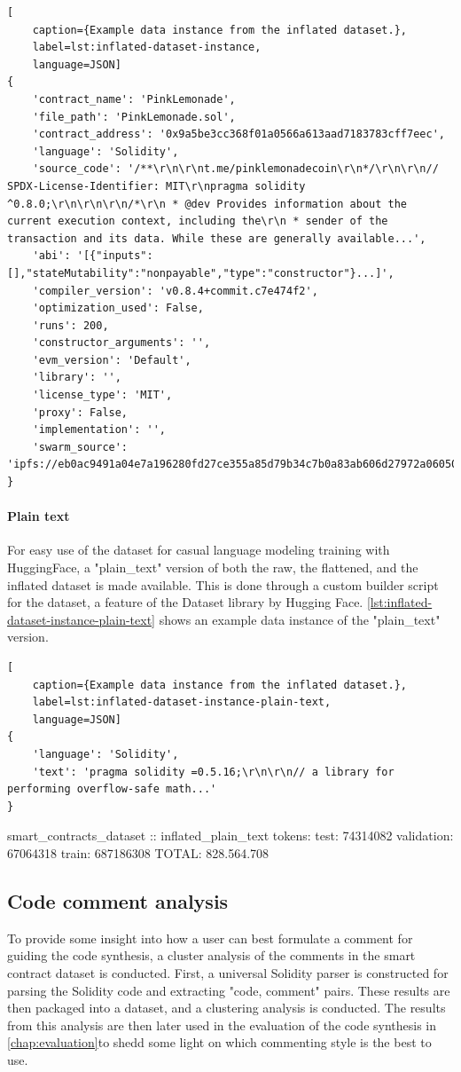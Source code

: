 \begin{lstlisting}[
    caption={Example data instance from the inflated dataset.},
    label=lst:inflated-dataset-instance,
    language=JSON]
{
    'contract_name': 'PinkLemonade',
    'file_path': 'PinkLemonade.sol',
    'contract_address': '0x9a5be3cc368f01a0566a613aad7183783cff7eec',
    'language': 'Solidity',
    'source_code': '/**\r\n\r\nt.me/pinklemonadecoin\r\n*/\r\n\r\n// SPDX-License-Identifier: MIT\r\npragma solidity ^0.8.0;\r\n\r\n\r\n/*\r\n * @dev Provides information about the current execution context, including the\r\n * sender of the transaction and its data. While these are generally available...',
    'abi': '[{"inputs":[],"stateMutability":"nonpayable","type":"constructor"}...]',
    'compiler_version': 'v0.8.4+commit.c7e474f2',
    'optimization_used': False,
    'runs': 200,
    'constructor_arguments': '',
    'evm_version': 'Default',
    'library': '',
    'license_type': 'MIT',
    'proxy': False,
    'implementation': '',
    'swarm_source': 'ipfs://eb0ac9491a04e7a196280fd27ce355a85d79b34c7b0a83ab606d27972a06050c'
}
\end{lstlisting}

\paragraph{Plain text}
\label{sec:verified-smart-contracts-plain-text}
For easy use of the dataset for casual language modeling training with HuggingFace, a "plain\_text" version of both the raw, the flattened, and the inflated dataset is made available. This is done through a custom builder script for the dataset, a feature of the Dataset library by Hugging Face. \cref{lst:inflated-dataset-instance-plain-text} shows an example data instance of the "plain\_text" version.


\begin{lstlisting}[
    caption={Example data instance from the inflated dataset.},
    label=lst:inflated-dataset-instance-plain-text,
    language=JSON]
{
    'language': 'Solidity',
    'text': 'pragma solidity =0.5.16;\r\n\r\n// a library for performing overflow-safe math...'
}
\end{lstlisting}

smart\_contracts\_dataset :: inflated\_plain\_text tokens:
	test: 74314082
	validation: 67064318
	train: 687186308
TOTAL: 828.564.708

\FloatBarrier

\subsection{Code comment analysis}
\label{sec:comment-analysis}
To provide some insight into how a user can best formulate a comment for guiding the code synthesis, a cluster analysis of the comments in the smart contract dataset is conducted. First, a universal Solidity parser is constructed for parsing the Solidity code and extracting "code, comment" pairs. These results are then packaged into a dataset, and a clustering analysis is conducted. The results from this analysis are then later used in the evaluation of the code synthesis in \cref{chap:evaluation}to shedd some light on which commenting style is the best to use.

